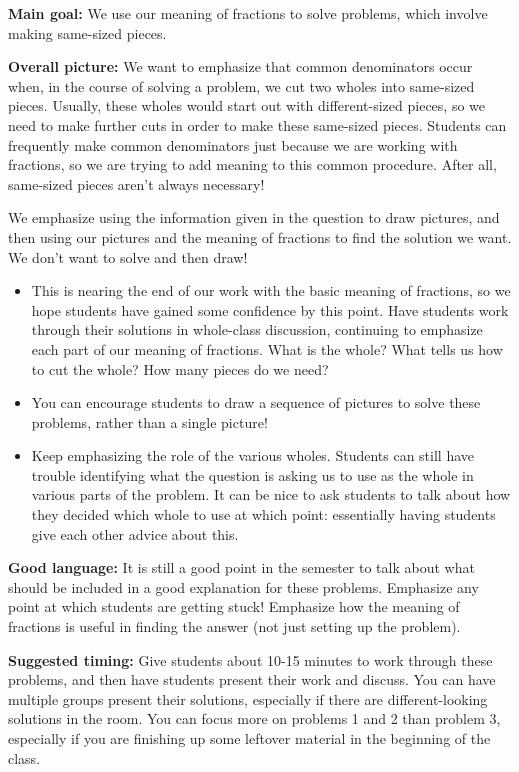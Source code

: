 \documentclass[nooutcomes,noauthor, handout]{ximera}
\begin{document}
\newpage

\begin{instructorNotes} 
{\bf Main goal:} We use our meaning of fractions to solve problems, which involve making same-sized pieces.


{\bf Overall picture:} We want to emphasize that common denominators occur when, in the course of solving a problem, we cut two wholes into same-sized pieces. Usually, these wholes would start out with different-sized pieces, so we need to make further cuts in order to make these same-sized pieces. Students can frequently make common denominators just because we are working with fractions, so we are trying to add meaning to this common procedure. After all, same-sized pieces aren't always necessary! 

We emphasize using the information given in the question to draw pictures, and then using our pictures and the meaning of fractions to find the solution we want. We don't want to solve and then draw!

\begin{itemize}
	\item This is nearing the end of our work with the basic meaning of fractions, so we hope students have gained some confidence by this point. Have students work through their solutions in whole-class discussion, continuing to emphasize each part of our meaning of fractions. What is the whole? What tells us how to cut the whole? How many pieces do we need?
	\item You can encourage students to draw a sequence of pictures to solve these problems, rather than a single picture!
	\item Keep emphasizing the role of the various wholes. Students can still have trouble identifying what the question is asking us to use as the whole in various parts of the problem. It can be nice to ask students to talk about how they decided which whole to use at which point: essentially having students give each other advice about this.
\end{itemize}


{\bf Good language:}  It is still a good point in the semester to talk about what should be included in a good explanation for these problems. Emphasize any point at which students are getting stuck! Emphasize how the meaning of fractions is useful in finding the answer (not just setting up the problem).


{\bf Suggested timing:} Give students about 10-15 minutes to work through these problems, and then have students present their work and discuss. You can have multiple groups present their solutions, especially if there are different-looking solutions in the room. You can focus more on problems 1 and 2 than problem 3, especially if you are finishing up some leftover material in the beginning of the class.






\end{instructorNotes}
\end{document}
